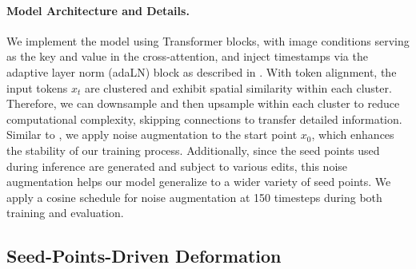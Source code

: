 \paragraph{Model Architecture and Details.}
We implement the model using Transformer blocks, with image conditions serving as the key and value in the cross-attention, and inject timestamps via the adaptive layer norm (adaLN) block as described in \cite{peebles2023scalable}. With token alignment, the input tokens \( x_t \) are clustered and exhibit spatial similarity within each cluster. Therefore, we can downsample and then upsample within each cluster to reduce computational complexity, skipping connections to transfer detailed information.
Similar to \cite{deng2024detailgen3d,fischer2023boosting}, we apply noise augmentation to the start point \( x_0 \), which enhances the stability of our training process. Additionally, since the seed points used during inference are generated and subject to various edits, this noise augmentation helps our model generalize to a wider variety of seed points. We apply a cosine schedule for noise augmentation at 150 timesteps during both training and evaluation.






\subsection{Seed-Points-Driven Deformation}
\label{sec:seed-drag}

